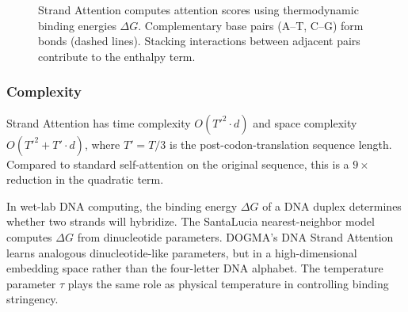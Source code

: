 \begin{figure}[H]
\centering
{}
\caption{Strand Attention computes attention scores using thermodynamic binding energies $\Delta G$. Complementary base pairs (A--T, C--G) form bonds (dashed lines). Stacking interactions between adjacent pairs contribute to the enthalpy term.}
\label{fig:strand-attention}
\end{figure}

\subsubsection{Complexity}

\begin{proposition}
\label{prop:strand-attention-complexity}
Strand Attention has time complexity $O(T'^2 \cdot d)$ and space complexity $O(T'^2 + T' \cdot d)$, where $T' = T/3$ is the post-codon-translation sequence length. Compared to standard self-attention on the original sequence, this is a $9\times$ reduction in the quadratic term.
\end{proposition}

\begin{implnote}
In wet-lab DNA computing, the binding energy $\Delta G$ of a DNA duplex determines whether two strands will hybridize. The SantaLucia nearest-neighbor model computes $\Delta G$ from dinucleotide parameters. DOGMA's DNA Strand Attention learns analogous dinucleotide-like parameters, but in a high-dimensional embedding space rather than the four-letter DNA alphabet. The temperature parameter $\tau$ plays the same role as physical temperature in controlling binding stringency.
\end{implnote}

